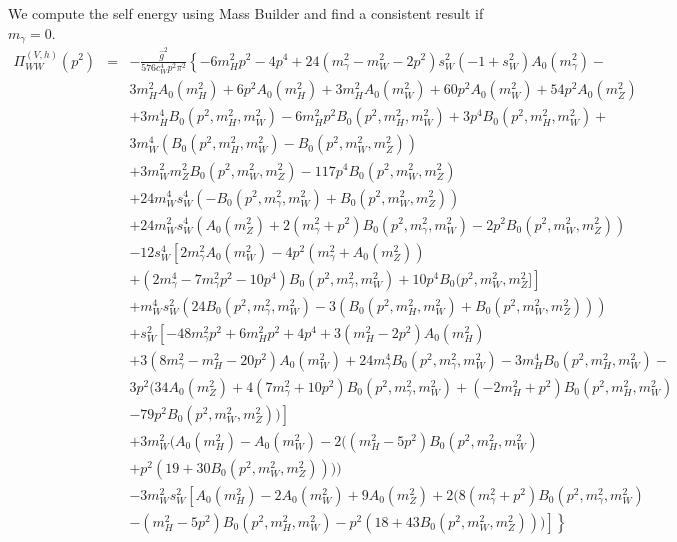 \documentclass[11pt]{article}
\newcommand{\mb}{\textsf{Mass Builder} \! }
\begin{document}
We compute the self energy using \mb and find a consistent result if $m_{\gamma}=0$.  
{
\begin{eqnarray}
\Pi_{WW}^{(V,h)}(p^2) &=& 
-\frac{ \hat{g}^2} {576 c_W^4 p^2 \pi^2}\left\{ -6 m_H^2 p^2 - 4 p^4 \right.+  24 (m_{\gamma}^2 - m_W^2 - 2 p^2) s_W^2 (-1 + s_W^2) A_0(m_{\gamma}^2) -  \nonumber\\
&&   3 m_H^2 A_0(m_H^2) + 6 p^2 A_0(m_H^2) + 3 m_H^2 A_0(m_W^2) + 60 p^2 A_0(m_W^2) + 54 p^2 A_0(m_Z^2)\nonumber \\
&&   + 3 m_H^4 B_0(p^2, m_H^2, m_W^2) -6 m_H^2 p^2 B_0(p^2, m_H^2, m_W^2) + 3 p^4 B_0(p^2, m_H^2, m_W^2) + \nonumber\\
&&   3 m_W^4 (B_0(p^2, m_H^2, m_W^2) - B_0(p^2, m_W^2, m_Z^2))\nonumber \\
&&   + 3 m_W^2 m_Z^2 B_0(p^2, m_W^2, m_Z^2) - 117 p^4 B_0(p^2, m_W^2, m_Z^2) \nonumber\\
&&   + 24 m_W^4 s_W^4 (-B_0(p^2, m_{\gamma}^2, m_W^2) + B_0(p^2, m_W^2, m_Z^2))\nonumber \\
&&   + 24 m_W^2 s_W^4 (A_0(m_Z^2) + 2 (m_{\gamma}^2 + p^2) B_0(p^2, m_{\gamma}^2, m_W^2) - 2 p^2 B_0(p^2, m_W^2, m_Z^2))\nonumber \\
&&   - 12 s_W^4 \left[    2 m_{\gamma}^2 A_0(m_W^2) -  4 p^2 (m_{\gamma}^2 + A_0(m_Z^2)) \right.\nonumber \\
&& \left. + (2 m_{\gamma}^4 - 7 m_{\gamma}^2 p^2 - 10 p^4) B_0(p^2,m_{\gamma}^2, m_W^2) + 10 p^4 B_0(p^2, m_W^2, m_Z^2]\right] \nonumber\\
&&  + m_W^4 s_W^2 (24 B_0(p^2, m_{\gamma}^2, m_W^2) - 3 (B_0(p^2, m_H^2, m_W^2) + B_0(p^2, m_W^2, m_Z^2))) \nonumber\\
&&   +  s_W^2 \left[-48 m_{\gamma}^2 p^2 + 6 m_H^2 p^2 + 4 p^4 +  3 (m_H^2 - 2 p^2) A_0(m_H^2)
\right.\nonumber\\
&&   +  3 (8 m_{\gamma}^2 - m_H^2 - 20 p^2) A_0(m_W^2) +   24 m_{\gamma}^4 B_0(p^2, m_{\gamma}^2, m_W^2) - 3 m_H^4 B_0(p^2, m_H^2, m_W^2) - \nonumber\\
&&    3 p^2 (34 A_0(m_Z^2) + 4 (7 m_{\gamma}^2 + 10 p^2) B_0(p^2, m_{\gamma}^2, m_W^2) + (-2 m_H^2 + p^2) B_0(p^2, m_H^2, m_W^2) \nonumber\\
&& \left.- 79 p^2 B_0(p^2, m_W^2, m_Z^2))\right]    \nonumber\\
&& +  3 m_W^2 (A_0(m_H^2) - A_0(m_W^2) -  2 ((m_H^2 - 5 p^2) B_0(p^2, m_H^2, m_W^2)\nonumber\\
&&       + p^2 (19 + 30 B_0(p^2, m_W^2, m_Z^2))))\nonumber \\
&&     - 3 m_W^2 s_W^2 \left[A_0(m_H^2) - 2 A_0(m_W^2) + 9 A_0(m_Z^2) + 2 (8 (m_{\gamma}^2 + p^2) B_0(p^2, m_{\gamma}^2, m_W^2) \right.\nonumber\\
&& \left. \left .- (m_H^2 - 5 p^2) B_0(p^2, m_H^2, m_W^2) - p^2 (18 + 43 B_0(p^2, m_W^2, m_Z^2)))\right] \right\}\label{eqn:mb_WW}
\end{eqnarray}
}
\end{document}

